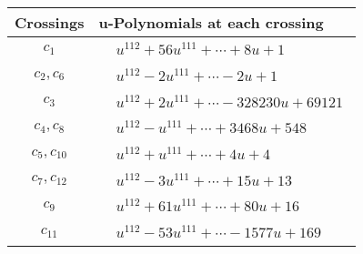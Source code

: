 \documentclass[1p]{elsarticle_modified}
\theoremstyle{definition}
\begin{document}
\begin{tabular}{m{50pt}|m{274pt}}
Crossings & \hspace{64pt}u-Polynomials at each crossing \\
\hline $$\begin{aligned}c_{1}\end{aligned}$$&$\begin{aligned}
&u^{112}+56 u^{111}+\cdots+8 u+1
\end{aligned}$\\
\hline $$\begin{aligned}c_{2},c_{6}\end{aligned}$$&$\begin{aligned}
&u^{112}-2 u^{111}+\cdots-2 u+1
\end{aligned}$\\
\hline $$\begin{aligned}c_{3}\end{aligned}$$&$\begin{aligned}
&u^{112}+2 u^{111}+\cdots-328230 u+69121
\end{aligned}$\\
\hline $$\begin{aligned}c_{4},c_{8}\end{aligned}$$&$\begin{aligned}
&u^{112}- u^{111}+\cdots+3468 u+548
\end{aligned}$\\
\hline $$\begin{aligned}c_{5},c_{10}\end{aligned}$$&$\begin{aligned}
&u^{112}+u^{111}+\cdots+4 u+4
\end{aligned}$\\
\hline $$\begin{aligned}c_{7},c_{12}\end{aligned}$$&$\begin{aligned}
&u^{112}-3 u^{111}+\cdots+15 u+13
\end{aligned}$\\
\hline $$\begin{aligned}c_{9}\end{aligned}$$&$\begin{aligned}
&u^{112}+61 u^{111}+\cdots+80 u+16
\end{aligned}$\\
\hline $$\begin{aligned}c_{11}\end{aligned}$$&$\begin{aligned}
&u^{112}-53 u^{111}+\cdots-1577 u+169
\end{aligned}$\\
\hline
\end{tabular}\\~\\
\end{document}
